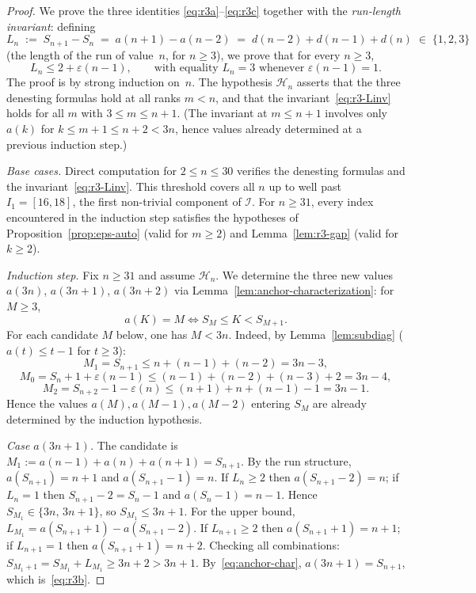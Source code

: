 \documentclass[10pt,a4paper]{amsart}
\begin{document}
\begin{proof}
We prove the three identities \eqref{eq:r3a}--\eqref{eq:r3c} together with
the \emph{run-length invariant}: defining
\begin{equation}\label{eq:Ldef}
  L_n\;:=\;S_{n+1}-S_n\;=\;a(n+1)-a(n-2)\;=\;d(n-2)+d(n-1)+d(n)
  \;\in\;\{1,2,3\}
\end{equation}
(the length of the run of value~$n$, for $n\ge 3$), we prove that for every $n\ge 3$,
\begin{equation}\label{eq:r3-Linv}
  L_n \le 2+\varepsilon(n-1),
  \qquad\text{with equality } L_n=3 \text{ whenever } \varepsilon(n-1)=1.
\end{equation}
The proof is by strong induction on~$n$.
The hypothesis $\mathcal{H}_n$ asserts that the three denesting formulas hold
at all ranks $m<n$, and that the invariant~\eqref{eq:r3-Linv} holds for
all $m$ with $3\le m\le n+1$.
(The invariant at $m\le n+1$ involves only $a(k)$ for $k\le m+1\le n+2<3n$,
hence values already determined at a previous induction step.)

\textit{Base cases.}
Direct computation for $2\le n\le 30$ verifies the denesting formulas
and the invariant~\eqref{eq:r3-Linv}.
This threshold covers all $n$ up to well past $I_1=[16,18]$,
the first non-trivial component of $\mathcal{I}$. For $n\ge 31$, every index
encountered in the induction step satisfies the hypotheses of
Proposition~\ref{prop:eps-auto} (valid for $m\ge 2$) and
Lemma~\ref{lem:r3-gap} (valid for $k\ge 2$).

\textit{Induction step.}
Fix $n\ge 31$ and assume $\mathcal{H}_n$.
We determine the three new values $a(3n)$, $a(3n+1)$, $a(3n+2)$
via Lemma~\ref{lem:anchor-characterization}: for $M\ge 3$,
\begin{equation}\label{eq:anchor-char}
  a(K)=M \iff S_M\le K<S_{M+1}.
\end{equation}
For each candidate $M$ below, one has $M<3n$.
Indeed, by Lemma~\ref{lem:subdiag} ($a(t)\le t-1$ for $t\ge 3$):
\[
  M_1 = S_{n+1} \le n+(n{-}1)+(n{-}2)=3n{-}3,
\]
\[
  M_0 = S_n+1+\varepsilon(n{-}1) \le (n{-}1)+(n{-}2)+(n{-}3)+2 = 3n{-}4,
\]
\[
  M_2 = S_{n+2}-1-\varepsilon(n) \le (n{+}1)+n+(n{-}1)-1 = 3n{-}1.
\]
Hence the values $a(M),a(M-1),a(M-2)$ entering $S_M$ are
already determined by the induction hypothesis.

\textit{Case $a(3n+1)$.}
The candidate is $M_1:=a(n-1)+a(n)+a(n+1)=S_{n+1}$.
By the run structure, $a(S_{n+1})=n+1$ and $a(S_{n+1}-1)=n$.
If $L_n\ge 2$ then $a(S_{n+1}-2)=n$; if $L_n=1$ then
$S_{n+1}-2=S_n-1$ and $a(S_n-1)=n-1$.
Hence $S_{M_1}\in\{3n,\,3n+1\}$, so $S_{M_1}\le 3n+1$.
For the upper bound,
$L_{M_1}=a(S_{n+1}+1)-a(S_{n+1}-2)$.
If $L_{n+1}\ge 2$ then $a(S_{n+1}+1)=n+1$;
if $L_{n+1}=1$ then $a(S_{n+1}+1)=n+2$.
Checking all combinations: $S_{M_1+1}=S_{M_1}+L_{M_1}\ge 3n+2>3n+1$.
By~\eqref{eq:anchor-char}, $a(3n+1)=S_{n+1}$,
which is~\eqref{eq:r3b}.


\end{proof}
\end{document}
